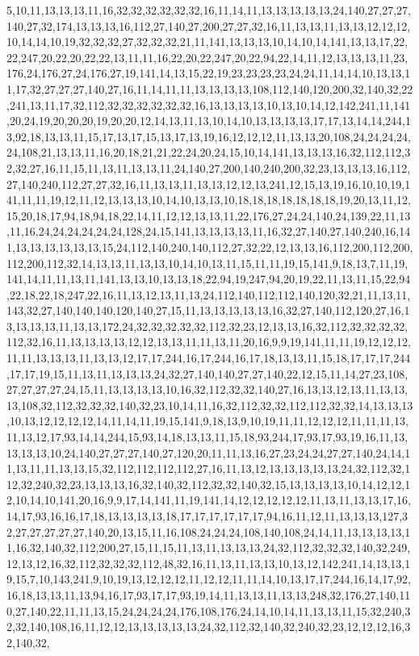 5,10,11,13,13,13,11,16,32,32,32,32,32,32,16,11,14,11,13,13,13,13,13,24,140,27,27,27,140,27,32,174,13,13,13,16,112,27,140,27,200,27,27,32,16,11,13,13,11,13,13,12,12,12,10,14,14,10,19,32,32,32,27,32,32,32,21,11,141,13,13,13,10,14,10,14,141,13,13,17,22,22,247,20,22,20,22,22,13,11,11,16,22,20,22,247,20,22,94,22,14,11,12,13,13,13,11,23,176,24,176,27,24,176,27,19,141,14,13,15,22,19,23,23,23,23,24,24,11,14,14,10,13,13,11,17,32,27,27,27,140,27,16,11,14,11,11,13,13,13,13,108,112,140,120,200,32,140,32,22,241,13,11,17,32,112,32,32,32,32,32,32,16,13,13,13,13,10,13,10,14,12,142,241,11,141,20,24,19,20,20,20,19,20,20,12,14,13,11,13,10,14,10,13,13,13,13,17,17,13,14,14,244,13,92,18,13,13,11,15,17,13,17,15,13,17,13,19,16,12,12,12,11,13,13,20,108,24,24,24,24,24,108,21,13,13,11,16,20,18,21,21,22,24,20,24,15,10,14,141,13,13,13,16,32,112,112,32,32,27,16,11,15,11,13,11,13,13,11,24,140,27,200,140,240,200,32,23,13,13,13,16,112,27,140,240,112,27,27,32,16,11,13,13,11,13,13,12,12,13,241,12,15,13,19,16,10,10,19,141,11,11,19,12,11,12,13,13,13,10,14,10,13,13,10,18,18,18,18,18,18,18,19,20,13,11,12,15,20,18,17,94,18,94,18,22,14,11,12,12,13,13,11,22,176,27,24,24,140,24,139,22,11,13,11,16,24,24,24,24,24,24,128,24,15,141,13,13,13,13,11,16,32,27,140,27,140,240,16,141,13,13,13,13,13,13,15,24,112,140,240,140,112,27,32,22,12,13,13,16,112,200,112,200,112,200,112,32,14,13,13,11,13,13,10,14,10,13,11,15,11,11,19,15,141,9,18,13,7,11,19,141,14,11,11,13,11,141,13,13,10,13,13,18,22,94,19,247,94,20,19,22,11,13,11,15,22,94,22,18,22,18,247,22,16,11,13,12,13,11,13,24,112,140,112,112,140,120,32,21,11,13,11,143,32,27,140,140,140,120,140,27,15,11,13,13,13,13,13,16,32,27,140,112,120,27,16,13,13,13,13,11,13,13,172,24,32,32,32,32,32,112,32,23,12,13,13,16,32,112,32,32,32,32,112,32,16,11,13,13,13,13,12,12,13,13,11,11,13,11,20,16,9,9,19,141,11,11,19,12,12,12,11,11,13,13,13,11,13,13,12,17,17,244,16,17,244,16,17,18,13,13,11,15,18,17,17,17,244,17,17,19,15,11,13,11,13,13,13,24,32,27,140,140,27,27,140,22,12,15,11,14,27,23,108,27,27,27,27,24,15,11,13,13,13,13,10,16,32,112,32,32,140,27,16,13,13,12,13,11,13,13,13,108,32,112,32,32,32,140,32,23,10,14,11,16,32,112,32,32,112,112,32,32,14,13,13,13,10,13,12,12,12,12,14,11,14,11,19,15,141,9,18,13,9,10,19,11,11,12,12,12,11,11,11,13,11,13,12,17,93,14,14,244,15,93,14,18,13,13,11,15,18,93,244,17,93,17,93,19,16,11,13,13,13,13,10,24,140,27,27,27,140,27,120,20,11,11,13,16,27,23,24,24,27,27,140,24,14,11,13,11,11,13,13,15,32,112,112,112,112,27,16,11,13,12,13,13,13,13,13,24,32,112,32,112,32,240,32,23,13,13,13,16,32,140,32,112,32,32,140,32,15,13,13,13,13,10,14,12,12,12,10,14,10,141,20,16,9,9,17,14,141,11,19,141,14,12,12,12,12,12,11,13,11,13,13,17,16,14,17,93,16,16,17,18,13,13,13,13,18,17,17,17,17,17,17,94,16,11,12,11,13,13,13,127,32,27,27,27,27,27,140,20,13,15,11,16,108,24,24,24,108,140,108,24,14,11,13,13,13,13,11,16,32,140,32,112,200,27,15,11,15,11,13,11,13,13,13,24,32,112,32,32,32,140,32,249,12,13,12,16,32,112,32,32,32,112,48,32,16,11,13,11,13,13,10,13,12,142,241,14,13,13,19,15,7,10,143,241,9,10,19,13,12,12,12,11,12,12,11,11,14,10,13,17,17,244,16,14,17,92,16,18,13,13,11,13,94,16,17,93,17,17,93,19,14,11,13,13,11,13,13,248,32,176,27,140,110,27,140,22,11,11,13,15,24,24,24,24,176,108,176,24,14,10,14,11,13,13,11,15,32,240,32,32,140,108,16,11,12,12,13,13,13,13,13,24,32,112,32,140,32,240,32,23,12,12,12,16,32,140,32,
